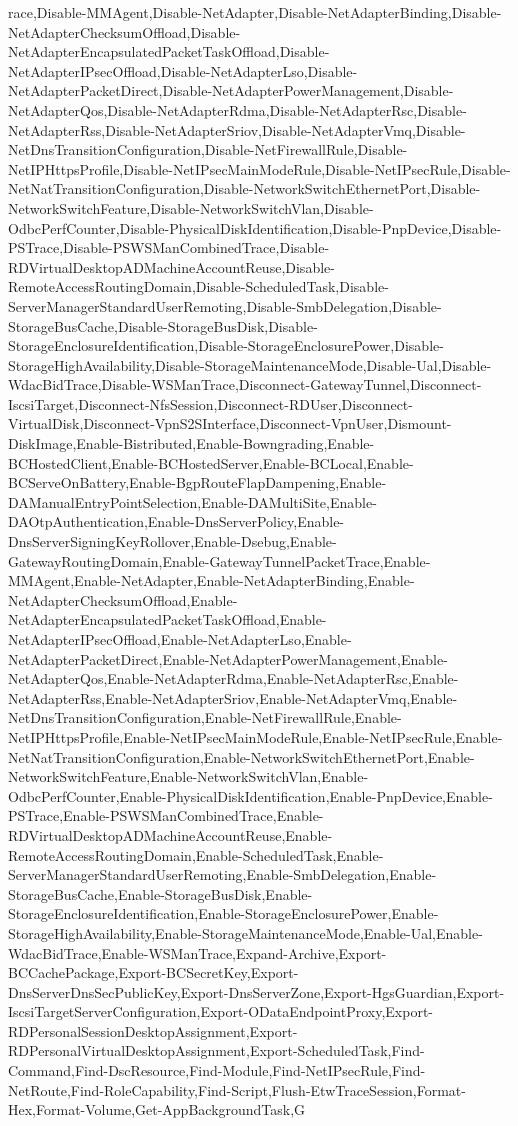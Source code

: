{{race,Disable-MMAgent,Disable-NetAdapter,Disable-NetAdapterBinding,Disable-NetAdapterChecksumOffload,Disable-NetAdapterEncapsulatedPacketTaskOffload,Disable-NetAdapterIPsecOffload,Disable-NetAdapterLso,Disable-NetAdapterPacketDirect,Disable-NetAdapterPowerManagement,Disable-NetAdapterQos,Disable-NetAdapterRdma,Disable-NetAdapterRsc,Disable-NetAdapterRss,Disable-NetAdapterSriov,Disable-NetAdapterVmq,Disable-NetDnsTransitionConfiguration,Disable-NetFirewallRule,Disable-NetIPHttpsProfile,Disable-NetIPsecMainModeRule,Disable-NetIPsecRule,Disable-NetNatTransitionConfiguration,Disable-NetworkSwitchEthernetPort,Disable-NetworkSwitchFeature,Disable-NetworkSwitchVlan,Disable-OdbcPerfCounter,Disable-PhysicalDiskIdentification,Disable-PnpDevice,Disable-PSTrace,Disable-PSWSManCombinedTrace,Disable-RDVirtualDesktopADMachineAccountReuse,Disable-RemoteAccessRoutingDomain,Disable-ScheduledTask,Disable-ServerManagerStandardUserRemoting,Disable-SmbDelegation,Disable-StorageBusCache,Disable-StorageBusDisk,Disable-StorageEnclosureIdentification,Disable-StorageEnclosurePower,Disable-StorageHighAvailability,Disable-StorageMaintenanceMode,Disable-Ual,Disable-WdacBidTrace,Disable-WSManTrace,Disconnect-GatewayTunnel,Disconnect-IscsiTarget,Disconnect-NfsSession,Disconnect-RDUser,Disconnect-VirtualDisk,Disconnect-VpnS2SInterface,Disconnect-VpnUser,Dismount-DiskImage,Enable-Bistributed,Enable-Bowngrading,Enable-BCHostedClient,Enable-BCHostedServer,Enable-BCLocal,Enable-BCServeOnBattery,Enable-BgpRouteFlapDampening,Enable-DAManualEntryPointSelection,Enable-DAMultiSite,Enable-DAOtpAuthentication,Enable-DnsServerPolicy,Enable-DnsServerSigningKeyRollover,Enable-Dsebug,Enable-GatewayRoutingDomain,Enable-GatewayTunnelPacketTrace,Enable-MMAgent,Enable-NetAdapter,Enable-NetAdapterBinding,Enable-NetAdapterChecksumOffload,Enable-NetAdapterEncapsulatedPacketTaskOffload,Enable-NetAdapterIPsecOffload,Enable-NetAdapterLso,Enable-NetAdapterPacketDirect,Enable-NetAdapterPowerManagement,Enable-NetAdapterQos,Enable-NetAdapterRdma,Enable-NetAdapterRsc,Enable-NetAdapterRss,Enable-NetAdapterSriov,Enable-NetAdapterVmq,Enable-NetDnsTransitionConfiguration,Enable-NetFirewallRule,Enable-NetIPHttpsProfile,Enable-NetIPsecMainModeRule,Enable-NetIPsecRule,Enable-NetNatTransitionConfiguration,Enable-NetworkSwitchEthernetPort,Enable-NetworkSwitchFeature,Enable-NetworkSwitchVlan,Enable-OdbcPerfCounter,Enable-PhysicalDiskIdentification,Enable-PnpDevice,Enable-PSTrace,Enable-PSWSManCombinedTrace,Enable-RDVirtualDesktopADMachineAccountReuse,Enable-RemoteAccessRoutingDomain,Enable-ScheduledTask,Enable-ServerManagerStandardUserRemoting,Enable-SmbDelegation,Enable-StorageBusCache,Enable-StorageBusDisk,Enable-StorageEnclosureIdentification,Enable-StorageEnclosurePower,Enable-StorageHighAvailability,Enable-StorageMaintenanceMode,Enable-Ual,Enable-WdacBidTrace,Enable-WSManTrace,Expand-Archive,Export-BCCachePackage,Export-BCSecretKey,Export-DnsServerDnsSecPublicKey,Export-DnsServerZone,Export-HgsGuardian,Export-IscsiTargetServerConfiguration,Export-ODataEndpointProxy,Export-RDPersonalSessionDesktopAssignment,Export-RDPersonalVirtualDesktopAssignment,Export-ScheduledTask,Find-Command,Find-DscResource,Find-Module,Find-NetIPsecRule,Find-NetRoute,Find-RoleCapability,Find-Script,Flush-EtwTraceSession,Format-Hex,Format-Volume,Get-AppBackgroundTask,G}}
